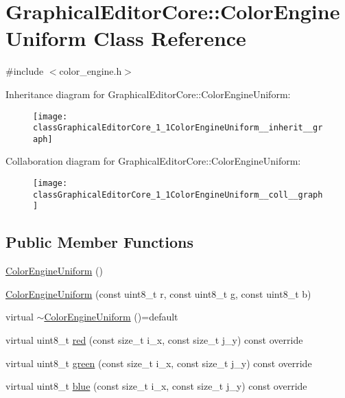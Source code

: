 \hypertarget{classGraphicalEditorCore_1_1ColorEngineUniform}{}\section{Graphical\+Editor\+Core\+:\+:Color\+Engine\+Uniform Class Reference}
\label{classGraphicalEditorCore_1_1ColorEngineUniform}


{\ttfamily \#include $<$color\+\_\+engine.\+h$>$}



Inheritance diagram for Graphical\+Editor\+Core\+:\+:Color\+Engine\+Uniform\+:
\nopagebreak
\begin{figure}[H]
\begin{center}
\leavevmode
\texttt{[image: classGraphicalEditorCore\_1\_1ColorEngineUniform\_\_inherit\_\_graph]}
\end{center}
\end{figure}


Collaboration diagram for Graphical\+Editor\+Core\+:\+:Color\+Engine\+Uniform\+:
\nopagebreak
\begin{figure}[H]
\begin{center}
\leavevmode
\texttt{[image: classGraphicalEditorCore\_1\_1ColorEngineUniform\_\_coll\_\_graph]}
\end{center}
\end{figure}
\subsection*{Public Member Functions}
\begin{DoxyCompactItemize}
\item 
\hyperlink{classGraphicalEditorCore_1_1ColorEngineUniform_a9e76ad9019e3bb878f6250ca57e2f777}{Color\+Engine\+Uniform} ()
\item 
\hyperlink{classGraphicalEditorCore_1_1ColorEngineUniform_aa91a594076b06d41154b68543870b388}{Color\+Engine\+Uniform} (const uint8\+\_\+t r, const uint8\+\_\+t g, const uint8\+\_\+t b)
\item 
virtual \hyperlink{classGraphicalEditorCore_1_1ColorEngineUniform_a0bfdba9e4751b79bdcf9692ad57fde34}{$\sim$\+Color\+Engine\+Uniform} ()=default
\item 
virtual uint8\+\_\+t \hyperlink{classGraphicalEditorCore_1_1ColorEngineUniform_a91461ce9955811e4e5e2f74cd2e9ec94}{red} (const size\+\_\+t i\+\_\+x, const size\+\_\+t j\+\_\+y) const override
\item 
virtual uint8\+\_\+t \hyperlink{classGraphicalEditorCore_1_1ColorEngineUniform_a219f34e3e5dabdf260e7c1adaa8bc2ee}{green} (const size\+\_\+t i\+\_\+x, const size\+\_\+t j\+\_\+y) const override
\item 
virtual uint8\+\_\+t \hyperlink{classGraphicalEditorCore_1_1ColorEngineUniform_ae5d9b3422740f667080f28d22a17830b}{blue} (const size\+\_\+t i\+\_\+x, const size\+\_\+t j\+\_\+y) const override
\end{DoxyCompactItemize}


